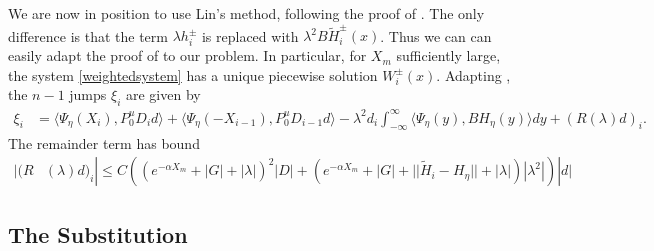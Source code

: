 \documentclass[thesis.tex]{subfiles}
\begin{document}
We are now in position to use Lin's method, following the proof of \cite[Theorem 2]{Sandstede1998}. The only difference is that the term $\lambda h_i^\pm$ is replaced with $\lambda^2 B \tilde{H}_i^\pm(x)$. Thus we can can easily adapt the proof of \cite[Theorem 2]{Sandstede1998} to our problem. In particular, for $X_m$ sufficiently large, the system \eqref{weightedsystem} has a unique piecewise solution $W_i^\pm(x)$. Adapting \cite[Lemma 3.6]{Sandstede1998}, the $n-1$ jumps $\xi_i$ are given by
\begin{align}\label{weightedjumps1}
\xi_i &= \langle \Psi_\eta(X_i), P_0^u D_i d \rangle
+ \langle \Psi_\eta(-X_{i-1}), P_0^u D_{i-1} d \rangle
- \lambda^2 d_i \int_{-\infty}^\infty \langle \Psi_\eta(y), B H_\eta(y) \rangle dy
+ (R(\lambda)d)_i.
\end{align}
The remainder term has bound
\begin{align*}\label{weightedR1}
|(R&(\lambda)d)_i| \leq C \left( (e^{-\alpha X_m} + |G| + |\lambda|)^2 |D| + (e^{-\alpha X_m} + |G| + ||\tilde{H}_i - H_\eta|| + |\lambda| )|\lambda^2| \right)|d|
\end{align*}

\subsection{The Substitution}
\end{document}
